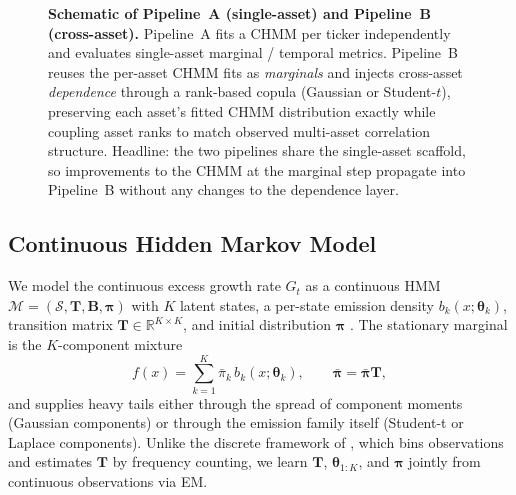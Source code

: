 \begin{figure}[t]
\caption{\textbf{Schematic of Pipeline~A (single-asset) and Pipeline~B (cross-asset).} Pipeline~A fits a CHMM per ticker independently and evaluates single-asset marginal / temporal metrics. Pipeline~B reuses the per-asset CHMM fits as \emph{marginals} and injects cross-asset \emph{dependence} through a rank-based copula (Gaussian or Student-$t$), preserving each asset's fitted CHMM distribution exactly while coupling asset ranks to match observed multi-asset correlation structure. Headline: the two pipelines share the single-asset scaffold, so improvements to the CHMM at the marginal step propagate into Pipeline~B without any changes to the dependence layer.}
\label{fig:pipeline_schematic}
\end{figure}

\subsection{Continuous Hidden Markov Model}
\label{sec:chmm_def}

We model the continuous excess growth rate $G_t$ as a continuous HMM
$\mathcal{M} = (\mathcal{S}, \mathbf{T}, \mathbf{B}, \boldsymbol{\pi})$
with $K$ latent states, a per-state emission density $b_k(x; \boldsymbol\theta_k)$,
transition matrix $\mathbf{T} \in \mathbb{R}^{K \times K}$, and initial
distribution $\boldsymbol{\pi}$ \cite{rabiner1986introduction}.
The stationary marginal is the $K$-component mixture
\begin{equation}
    f(x) = \sum_{k=1}^{K} \bar{\pi}_k\, b_k(x; \boldsymbol\theta_k),
    \qquad \bar{\boldsymbol{\pi}} = \bar{\boldsymbol{\pi}} \mathbf{T},
    \label{eq:mixture}
\end{equation}
and supplies heavy tails either through the spread of component moments
(Gaussian components) or through the emission family itself (Student-t or
Laplace components).
Unlike the discrete framework of \citet{alswaidan2026hybrid}, which bins
observations and estimates $\mathbf{T}$ by frequency counting, we learn
$\mathbf{T}$, $\boldsymbol\theta_{1:K}$, and $\boldsymbol{\pi}$ jointly
from continuous observations via EM.

